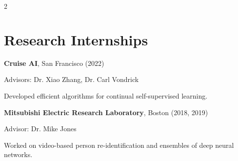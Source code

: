 \documentclass[10pt, letterpaper]{article}
\newcommand{\intern}[4]{{\bfseries #1}, #2\par{\small\color{muted} #3}\par\vspace{0.05cm}#4\par\vspace{0.25cm}}
\begin{document}
\begin{paracol}{2}
\section{Research Internships}
\intern{Cruise AI}{San Francisco (2022)}{Advisors: Dr. Xiao Zhang, Dr. Carl Vondrick}{Developed efficient algorithms for continual self-supervised learning.}
\intern{Mitsubishi Electric Research Laboratory}{Boston (2018, 2019)}{Advisor: Dr. Mike Jones}{Worked on video-based person re-identification and ensembles of deep neural networks.}
\end{paracol}
\end{document}
